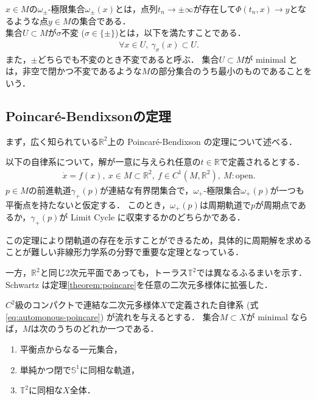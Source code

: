 \documentclass[../main]{subfiles}
\begin{document}
$x\in M$の$\omega_\pm$-極限集合$\omega_\pm(x)$とは，点列$t_n\to \pm\infty$が存在して$\Phi(t_n,x)\to y$となるような点$y\in M$の集合である．\\

集合$U\subset M$が$\sigma$不変 ($\sigma\in\{\pm\}$)とは，以下を満たすことである．
\begin{align}
    \forall x\in U,\ \gamma_\sigma (x)\subset U.
\end{align}
また，$\pm$どちらでも不変のとき不変であると呼ぶ．
集合$U\subset M$が minimal とは，非空で閉かつ不変であるような$M$の部分集合のうち最小のものであることをいう．
\subsection{Poincar\'{e}-Bendixsonの定理}
まず，広く知られている$\mathbb{R}^2$上の Poincar\'{e}-Bendixson の定理について述べる．
\begin{theorem}
    以下の自律系について，解が一意に与えられ任意の$t\in\mathbb{R}$で定義されるとする．
    \begin{align}
        \dot{x}=f(x),\ x\in M\subset \mathbb{R}^2,\ f\in C^1(M,\mathbb{R}^2),\ M:\mathrm{open}.         \label{eq:automonous-poincare}
    \end{align}
    $p\in M$の前進軌道$\gamma_+(p)$が連結な有界閉集合で，$\omega_+$-極限集合$\omega_+(p)$が一つも平衡点を持たないと仮定する．
    このとき，$\omega_+(p)$は周期軌道で$p$が周期点であるか，$\gamma_+(p)$が Limit Cycle に収束するかのどちらかである．
    \label{theorem:poincare}
\end{theorem}
この定理により閉軌道の存在を示すことができるため，具体的に周期解を求めることが難しい非線形力学系の分野で重要な定理となっている．

一方，$\mathbb{R}^2$と同じ2次元平面であっても，トーラス$\mathbb{T}^2$では異なるふるまいを示す．
Schwartz は定理\ref{theorem:poincare}を任意の二次元多様体に拡張した\cite{Schwartz1963ErrataAG}．
\begin{theorem}
    \label{thm:poiben-gen}
    $C^2$級のコンパクトで連結な二次元多様体$X$で定義された自律系 (式\eqref{eq:automonous-poincare}) が流れを与えるとする．
    集合$M\subset X$が minimal ならば，$M$は次のうちのどれか一つである．
    \begin{enumerate}
        \item 平衡点からなる一元集合，
        \item 単純かつ閉で$\mathbb{S}^1$に同相な軌道，
        \item $\mathbb{T}^2$に同相な$X$全体．
    \end{enumerate}
\end{theorem}
\end{document}
